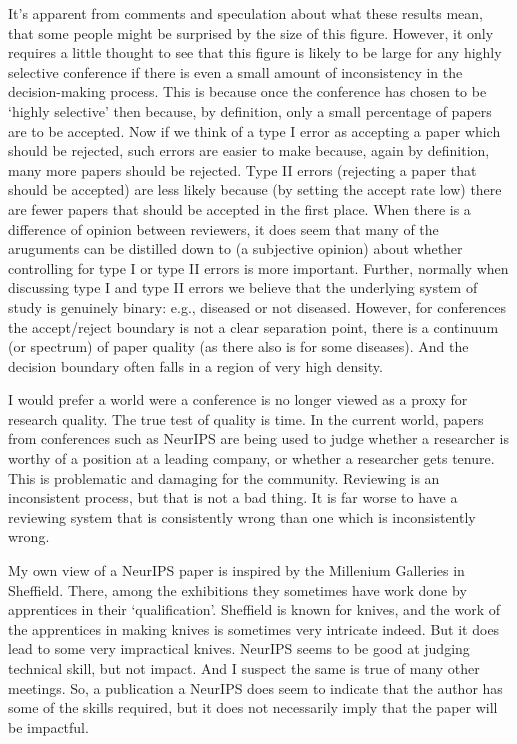 It's apparent from comments and speculation about what these results
mean, that some people might be surprised by the size of this figure.
However, it only requires a little thought to see that this figure is
likely to be large for any highly selective conference if there is even
a small amount of inconsistency in the decision-making process. This is
because once the conference has chosen to be `highly selective' then
because, by definition, only a small percentage of papers are to be
accepted. Now if we think of a type I error as accepting a paper which
should be rejected, such errors are easier to make because, again by
definition, many more papers should be rejected. Type II errors
(rejecting a paper that should be accepted) are less likely because (by
setting the accept rate low) there are fewer papers that should be
accepted in the first place. When there is a difference of opinion
between reviewers, it does seem that many of the aruguments can be
distilled down to (a subjective opinion) about whether controlling for
type I or type II errors is more important. Further, normally when
discussing type I and type II errors we believe that the underlying
system of study is genuinely binary: e.g., diseased or not diseased.
However, for conferences the accept/reject boundary is not a clear
separation point, there is a continuum (or spectrum) of paper quality
(as there also is for some diseases). And the decision boundary often
falls in a region of very high density.

I would prefer a world were a conference is no longer viewed as a proxy
for research quality. The true test of quality is time. In the current
world, papers from conferences such as NeurIPS are being used to judge
whether a researcher is worthy of a position at a leading company, or
whether a researcher gets tenure. This is problematic and damaging for
the community. Reviewing is an inconsistent process, but that is not a
bad thing. It is far worse to have a reviewing system that is
consistently wrong than one which is inconsistently wrong.

My own view of a NeurIPS paper is inspired by the Millenium Galleries in
Sheffield. There, among the exhibitions they sometimes have work done by
apprentices in their `qualification'. Sheffield is known for knives, and
the work of the apprentices in making knives is sometimes very intricate
indeed. But it does lead to some very impractical knives. NeurIPS seems
to be good at judging technical skill, but not impact. And I suspect the
same is true of many other meetings. So, a publication a NeurIPS does
seem to indicate that the author has some of the skills required, but it
does not necessarily imply that the paper will be impactful.

